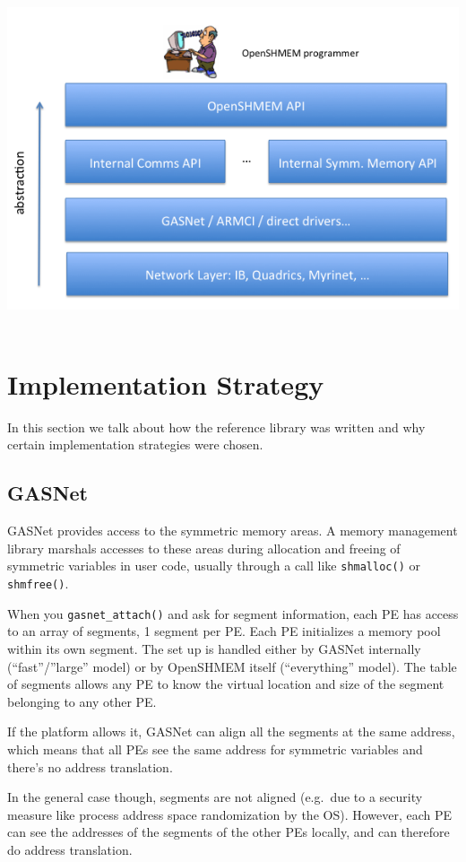 \documentclass[english]{article}
\begin{document}
\medskip{}

\title{\includegraphics[scale=0.5]{implementation}}

\section{Implementation Strategy}

In this section we talk about how the reference library was written
and why certain implementation strategies were chosen.

\subsection{GASNet}

GASNet provides access to the symmetric memory areas. A memory
management library marshals accesses to these areas during allocation
and freeing of symmetric variables in user code, usually through a
call like \texttt{shmalloc()} or \texttt{shmfree()}.

When you \texttt{gasnet\_attach()} and ask for segment information,
each PE has access to an array of segments, 1 segment per PE. Each PE
initializes a memory pool within its own segment. The set up is
handled either by GASNet internally (``fast''/''large'' model) or by
OpenSHMEM itself (``everything'' model). The table of segments
allows any PE to know the virtual location and size of the segment
belonging to any other PE.

If the platform allows it, GASNet can align all the segments at the
same address, which means that all PEs see the same address for
symmetric variables and there's no address translation.

In the general case though, segments are not aligned (e.g.\ due to a
security measure like process address space randomization by the
OS). However, each PE can see the addresses of the segments of the
other PEs locally, and can therefore do address translation.
\end{document}
